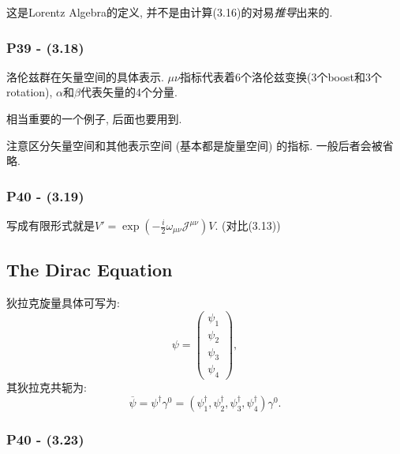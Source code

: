 \documentclass[cn,hazy,green,11pt,device=normal,chinesefont=founder]{elegantnote}
\begin{document}
这是Lorentz Algebra的定义, 并不是由计算(3.16)的对易\textit{推导}出来的. 

\subsubsection{P39 - (3.18)}

洛伦兹群在矢量空间的具体表示. $\mu\nu$指标代表着6个洛伦兹变换(3个boost和3个rotation), $\alpha$和$\beta$代表矢量的4个分量. 

相当重要的一个例子, 后面也要用到. 
\begin{remark}
  注意区分矢量空间和其他表示空间 (基本都是旋量空间) 的指标. 一般后者会被省略. 
\end{remark}

\subsubsection{P40 - (3.19)}

写成有限形式就是$V' = \exp{(-\frac{i}{2}\omega_{\mu\nu}\mathcal{J}^{\mu\nu})}V$. (对比(3.13))

\subsection{The Dirac Equation}

\begin{note}
  狄拉克旋量具体可写为:  
  \begin{equation}
    \psi = \left( \begin{array}{c} \psi_1 \\ \psi_2 \\ \psi_3 \\ \psi_4 \end{array} \right), 
  \end{equation}
  其狄拉克共轭为: 
  \begin{equation}
    \overline{\psi} = \psi^\dagger \gamma^0 = (\psi^\dagger_1, \psi^\dagger_2, \psi^\dagger_3, \psi^\dagger_4)\gamma^0. 
  \end{equation}
\end{note}

\subsubsection{P40 - (3.23)}
\end{document}
